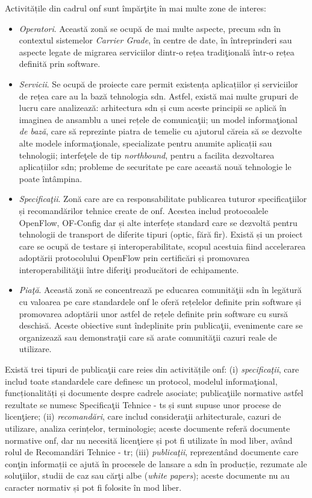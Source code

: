 Activitățile din cadrul \gls{onf} sunt împărţite în mai multe zone de interes:
\begin{itemize}
	\item \textit{Operatori}. Această zonă se ocupă de mai multe aspecte, precum \gls{sdn} în contextul sistemelor \textit{Carrier Grade}, în centre de date, în întreprinderi sau aspecte legate de migrarea serviciilor dintr-o rețea tradiţională într-o rețea definită prin software.
	\item \textit{Servicii}. Se ocupă de proiecte care permit existența aplicațiilor și serviciilor de rețea care au la bază tehnologia \gls{sdn}. Astfel, există mai multe grupuri de lucru care analizează: arhitectura \gls{sdn} și cum aceste principii se aplică în imaginea de ansamblu a unei rețele de comunicaţii; un model informaţional \textit{de bază}, care să reprezinte piatra de temelie cu ajutorul căreia să se dezvolte alte modele informaţionale, specializate pentru anumite aplicații sau tehnologii; interfeţele de tip \textit{northbound}, pentru a facilita dezvoltarea aplicațiilor \gls{sdn}; probleme de securitate pe care această nouă tehnologie le poate întâmpina.  
	\item \textit{Specificaţii}. Zonă care are ca responsabilitate publicarea tuturor specificaţiilor și recomandărilor tehnice create de \gls{onf}. Acestea includ protocoalele OpenFlow, OF-Config dar și alte interfețe standard care se dezvoltă pentru tehnologii de transport de diferite tipuri (optic, fără fir). Există și un proiect care se ocupă de testare și interoperabilitate, scopul acestuia fiind accelerarea adoptării protocolului OpenFlow prin certificări și promovarea interoperabilităţii între diferiţi producători de echipamente.
	\item \textit{Piaţă}. Această zonă se concentrează pe educarea comunităţii \gls{sdn} în legătură cu valoarea pe care standardele \gls{onf} le oferă rețelelor definite prin software și promovarea adoptării unor astfel de rețele definite prin software cu sursă deschisă. Aceste obiective sunt îndeplinite prin publicaţii, evenimente care se organizează sau demonstraţii care să arate comunităţii cazuri reale de utilizare.
\end{itemize}

Există trei tipuri de publicaţii care reies din activitățile \gls{onf}: (i) \textit{specificaţii}, care includ toate standardele care definesc un protocol, modelul informaţional, funcționalități și documente despre cadrele asociate; publicaţiile normative astfel rezultate se numesc Specificaţii Tehnice - \gls{ts} și sunt supuse unor procese de licenţiere; (ii) \textit{recomandări}, care includ consideraţii arhitecturale, cazuri de utilizare, analiza cerințelor, terminologie; aceste documente referă documente normative \gls{onf}, dar nu necesită licenţiere și pot fi utilizate în mod liber, având rolul de Recomandări Tehnice - \gls{tr}; (iii) \textit{publicaţii}, reprezentând documente care conţin informații ce ajută în procesele de lansare a \gls{sdn} în producție, rezumate ale soluţiilor, studii de caz sau cărţi albe (\textit{white papers}); aceste documente nu au caracter normativ și pot fi folosite în mod liber.

